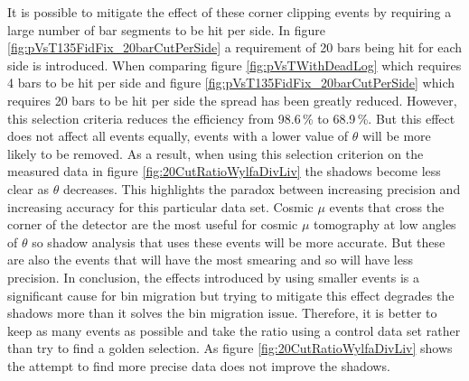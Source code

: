 

It is possible to mitigate the effect of these corner clipping events by requiring a large number of bar segments to be hit per side. In figure \ref{fig:pVsT135FidFix_20barCutPerSide} a requirement of 20 bars being hit for each side is introduced. When comparing figure \ref{fig:pVsTWithDeadLog} which requires 4 bars to be hit per side and figure \ref{fig:pVsT135FidFix_20barCutPerSide} which requires 20 bars to be hit per side the spread has been greatly reduced. However, this selection criteria reduces the efficiency from 98.6\,\% to 68.9\,\%. But this effect does not affect all events equally, events with a lower value of $\theta$ will be more likely to be removed. As a result, when using this selection criterion on the measured data in figure \ref{fig:20CutRatioWylfaDivLiv} the shadows become less clear as $\theta$ decreases. This highlights the paradox between increasing precision and increasing accuracy for this particular data set. Cosmic $\mu$ events that cross the corner of the detector are the most useful for cosmic $\mu$ tomography at low angles of $\theta$ so shadow analysis that uses these events will be more accurate. But these are also the events that will have the most smearing and so will have less precision. In conclusion, the effects introduced by using smaller events is a significant cause for bin migration but trying to mitigate this effect degrades the shadows more than it solves the bin migration issue. Therefore, it is better to keep as many events as possible and take the ratio using a control data set rather than try to find a golden selection. As figure \ref{fig:20CutRatioWylfaDivLiv} shows the attempt to find more precise data does not improve the shadows.


